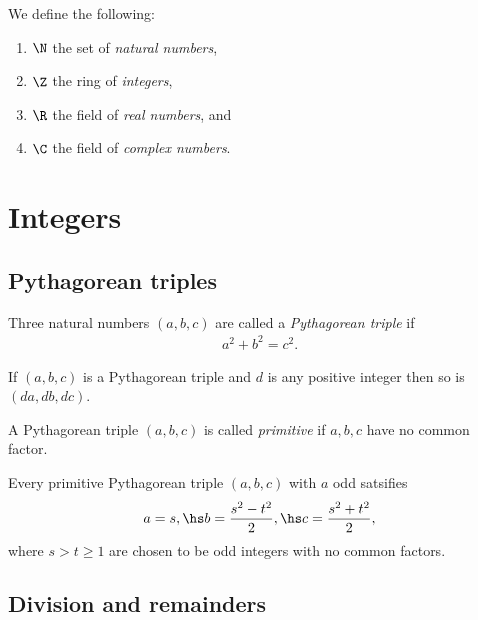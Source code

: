 \documentclass{article}
\begin{document}
\begin{definition}
	We define the following:
	\begin{enumerate}
		\item $\N$ the set of \emph{natural numbers},
		\item $\Z$ the ring of \emph{integers},
		\item $\R$ the field of \emph{real numbers}, and
		\item $\C$ the field of \emph{complex numbers}.
	\end{enumerate}
\end{definition}

\section{Integers}

\subsection{Pythagorean triples}

\begin{definition}
	Three natural numbers $(a,b,c)$ are called a \emph{Pythagorean triple} if
	\begin{align*}
		a^2 + b^2 = c^2.
	\end{align*}
\end{definition}

\begin{lemma}[Lecture 1]
	If $(a,b,c)$ is a Pythagorean triple and $d$ is any positive integer then
	so is $(da,db,dc)$.
\end{lemma}

\begin{definition}
	A Pythagorean triple $(a,b,c)$ is called \emph{primitive} if $a,b,c$ have no common factor.
\end{definition}

\begin{theorem}[Lecture 1]
	Every primitive Pythagorean triple $(a,b,c)$ with $a$ odd satsifies
	\begin{align*}
		a=s,\hs b=\frac{s^2-t^2}{2},\hs c=\frac{s^2+t^2}{2},
	\end{align*}
	where $s>t\geq 1$ are chosen to be odd integers with no common factors.
\end{theorem}

\subsection{Division and remainders}
\end{document}
